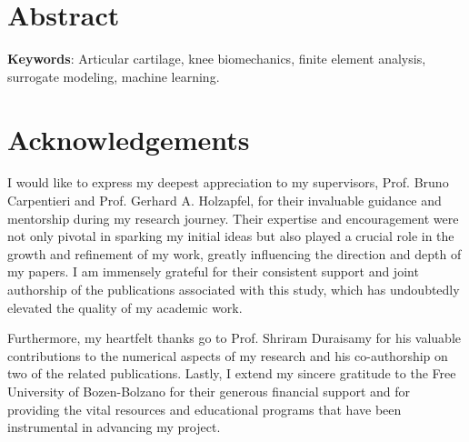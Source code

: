 \chapter*{Abstract}



\bigskip

\noindent
\textbf{Keywords}: Articular cartilage, knee biomechanics, finite element analysis, surrogate modeling, machine learning.
\acresetall


\chapter*{Acknowledgements}
%
I would like to express my deepest appreciation to my supervisors, Prof. Bruno Carpentieri and Prof. Gerhard A. Holzapfel, for their invaluable guidance and mentorship during my research journey. Their expertise and encouragement were not only pivotal in sparking my initial ideas but also played a crucial role in the growth and refinement of my work, greatly influencing the direction and depth of my papers. I am immensely grateful for their consistent support and joint authorship of the publications associated with this study, which has undoubtedly elevated the quality of my academic work.

Furthermore, my heartfelt thanks go to Prof. Shriram Duraisamy for his valuable contributions to the numerical aspects of my research and his co-authorship on two of the related publications. Lastly, I extend my sincere gratitude to the Free University of Bozen-Bolzano for their generous financial support and for providing the vital resources and educational programs that have been instrumental in advancing my project.

